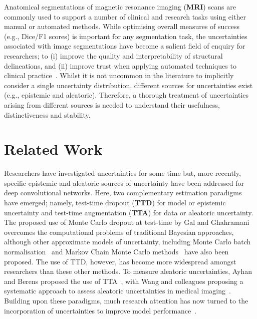 \documentclass[runningheads]{llncs}
\begin{document}
Anatomical segmentations of magnetic resonance imaging (\textbf{MRI}) scans are commonly used to support a number of clinical and research tasks using either manual or automated methods. While optimising overall measures of success (e.g., Dice/F1 scores) is important for any segmentation task, the uncertainties associated with image segmentations have become a salient field of enquiry for researchers; to (i) improve the quality and interpretability of structural delineations, and (ii) improve trust when applying automated techniques to clinical practice~\cite{ref_dinsdale}. Whilst it is not uncommon in the literature to implicitly consider a single uncertainty distribution, different sources for uncertainties exist (e.g., epistemic and aleatoric). Therefore, a thorough treatment of uncertainties arising from different sources is needed to understand their usefulness, distinctiveness and stability. 

\section{Related Work}
\label{sec:related_work}

Researchers have investigated uncertainties for some time but, more recently, specific epistemic and aleatoric sources of uncertainty have been addressed for deep convolutional networks. Here, two complementary estimation paradigms have emerged; namely, test-time dropout (\textbf{TTD}) for model or epistemic uncertainty and test-time augmentation (\textbf{TTA}) for data or aleatoric uncertainty. The proposed use of Monte Carlo dropout at test-time by Gal and Ghahramani~\cite{ref_gal} overcomes the computational problems of traditional Bayesian approaches, although other approximate models of uncertainty, including Monte Carlo batch normalisation~\cite{ref_taye} and Markov Chain Monte Carlo methods~\cite{ref_neal} have also been proposed. The use of TTD, however, has become more widespread amongst researchers than these other methods. To measure aleatoric uncertainties, Ayhan and Berens proposed the use of TTA~\cite{ref_ayhan}, with Wang and colleagues proposing a systematic approach to assess aleatoric uncertainties in medical imaging~\cite{ref_wang}.  Building upon these paradigms, much research attention has now turned to the incorporation of uncertainties to improve model performance~\cite{ref_ozdemir,ref_herzog,ref_wang2,ref_arega}. 
\end{document}
